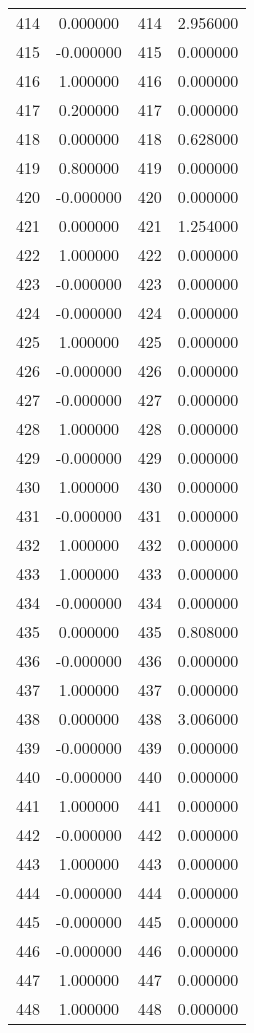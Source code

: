 \documentclass[12pt]{article}
\begin{document}
\begin{longtable}{@{}cccc@{}}
414 & 0.000000 & 414 & 2.956000 \\
415 & -0.000000 & 415 & 0.000000 \\
416 & 1.000000 & 416 & 0.000000 \\
417 & 0.200000 & 417 & 0.000000 \\
418 & 0.000000 & 418 & 0.628000 \\
419 & 0.800000 & 419 & 0.000000 \\
420 & -0.000000 & 420 & 0.000000 \\
421 & 0.000000 & 421 & 1.254000 \\
422 & 1.000000 & 422 & 0.000000 \\
423 & -0.000000 & 423 & 0.000000 \\
424 & -0.000000 & 424 & 0.000000 \\
425 & 1.000000 & 425 & 0.000000 \\
426 & -0.000000 & 426 & 0.000000 \\
427 & -0.000000 & 427 & 0.000000 \\
428 & 1.000000 & 428 & 0.000000 \\
429 & -0.000000 & 429 & 0.000000 \\
430 & 1.000000 & 430 & 0.000000 \\
431 & -0.000000 & 431 & 0.000000 \\
432 & 1.000000 & 432 & 0.000000 \\
433 & 1.000000 & 433 & 0.000000 \\
434 & -0.000000 & 434 & 0.000000 \\
435 & 0.000000 & 435 & 0.808000 \\
436 & -0.000000 & 436 & 0.000000 \\
437 & 1.000000 & 437 & 0.000000 \\
438 & 0.000000 & 438 & 3.006000 \\
439 & -0.000000 & 439 & 0.000000 \\
440 & -0.000000 & 440 & 0.000000 \\
441 & 1.000000 & 441 & 0.000000 \\
442 & -0.000000 & 442 & 0.000000 \\
443 & 1.000000 & 443 & 0.000000 \\
444 & -0.000000 & 444 & 0.000000 \\
445 & -0.000000 & 445 & 0.000000 \\
446 & -0.000000 & 446 & 0.000000 \\
447 & 1.000000 & 447 & 0.000000 \\
448 & 1.000000 & 448 & 0.000000 \\

\end{longtable}
\end{document}
